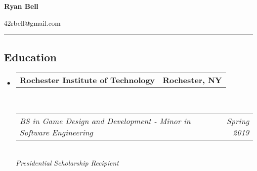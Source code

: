 \documentclass[10pt, letterpaper]{article}
\makeatletter
\newcommand{\headerrow}[2]
{\begin{tabular*}{\linewidth}{l@{\extracolsep{\fill}}r}
	#1 &
	#2 \\
\end{tabular*}}
\makeatother
\begin{document}
\begin{center}
	{\LARGE \textbf{Ryan Bell}}
\\
\end{center}
\noindent
{}\hfill 42rbell@gmail.com\hfill
{}\\
\hrule

\subsection*{Education}
\begin{itemize}
	\parskip=0.1em
	\item[]
	\headerrow
		{\textbf{Rochester Institute of Technology}}
		{\textbf{Rochester, NY}}
	\\
	\headerrow
		{\emph{BS in Game Design and Development - Minor in Software Engineering}}
		{\emph{Spring 2019}}
  \\
    \emph{Presidential Scholarship Recipient}
\end{itemize}

\vspace{-1em}
\end{document}
